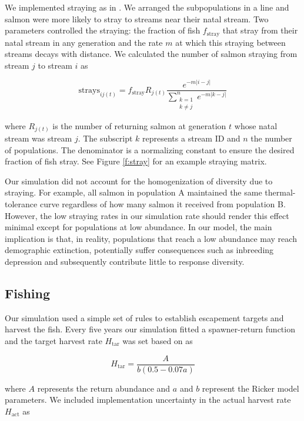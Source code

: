 We implemented straying as in \citet{cooper1999}. We arranged the subpopulations in a line and salmon were more likely to stray to streams near their natal stream. Two parameters controlled the straying: the fraction of fish $f_{\mathrm{stray}}$ that stray from their natal stream in any generation and the rate $m$ at which this straying between streams decays with distance. We calculated the number of salmon straying from stream $j$ to stream $i$ as

\[\mathrm{strays}_{ij(t)} = f_{\mathrm{stray}} R_{j(t)}
    \frac{e^{-m \lvert i-j \rvert }}
      {\displaystyle\sum\limits_{
        \substack{k = 1 \\ k \neq j}}^{n} 
        e^{-m \lvert k-j \rvert }}\]

\noindent where $R_{j(t)}$ is the number of returning salmon at generation $t$ whose natal stream was stream $j$. The subscript $k$ represents a stream ID and $n$ the number of populations. The denominator is a normalizing constant to ensure the desired fraction of fish stray. See Figure \ref{f:stray} for an example straying matrix.

Our simulation did not account for the homogenization of diversity due to straying. For example, all salmon in population A maintained the same thermal-tolerance curve regardless of how many salmon it received from population B. However, the low straying rates in our simulation rate should render this effect minimal except for populations at low abundance. In our model, the main implication is that, in reality, populations that reach a low abundance may reach demographic extinction, potentially suffer consequences such as inbreeding depression \citep{wang2002} and subsequently contribute little to response diversity.

\subsection{Fishing}

Our simulation used a simple set of rules to establish escapement targets and harvest the fish. Every five years our simulation fitted a spawner-return function and the target harvest rate $H_{\mathrm{tar}}$ was set based on \citet{hilborn1992} as

\[H_{\mathrm{tar}} = \frac{A}{b (0.5 - 0.07a)}
  \label{eq:esc}\]

\noindent where $A$ represents the return abundance and $a$ and $b$ represent the Ricker model parameters. We included implementation uncertainty in the actual harvest rate $H_{\mathrm{act}}$ as

